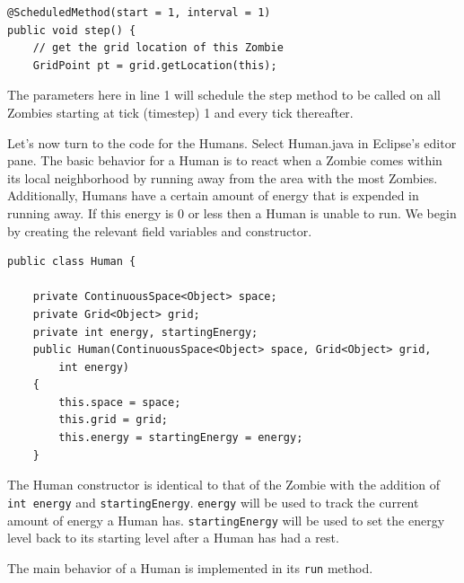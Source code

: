 \documentclass[11pt]{amsart}
\begin{document}
\noindent\begin{minipage}[h]{\textwidth}
\vspace{.2in}
\lstset{language=java,caption=Step Method with Annotation}
\begin{lstlisting}
@ScheduledMethod(start = 1, interval = 1)
public void step() {
	// get the grid location of this Zombie
	GridPoint pt = grid.getLocation(this);
\end{lstlisting}
\vspace{.2in}
\end{minipage}

The parameters here in line 1 will schedule the step method to be called on all Zombies starting at tick (timestep) 1 and every tick thereafter. 

Let's now turn to the code for the Humans. Select Human.java in Eclipse's editor pane. The basic behavior for a Human is to react when a Zombie comes within its local neighborhood by running away from the area with the most Zombies. Additionally, Humans have  a certain amount of energy that is expended in running away. If this energy is 0 or less then a Human is unable to run. We begin by creating the relevant field variables and constructor.

\noindent\begin{minipage}[h]{\textwidth}
\vspace{.2in}
\lstset{language=java,caption=Human Constructor and Variables}
\begin{lstlisting}
public class Human {
	
	private ContinuousSpace<Object> space;
	private Grid<Object> grid;
	private int energy, startingEnergy;
	public Human(ContinuousSpace<Object> space, Grid<Object> grid, 
		int energy) 
	{	
		this.space = space;
		this.grid = grid;
		this.energy = startingEnergy = energy;
	}
\end{lstlisting}
\vspace{.2in}
\end{minipage}
The Human constructor is identical to that of the Zombie with the addition of \texttt{int energy} and \texttt{startingEnergy}. \texttt{energy} will be used to track the current amount of energy a Human has.  \texttt{startingEnergy} will be used to set the energy level back to its starting level after a Human has had a rest. 

The main behavior of a Human is implemented in its \texttt{run} method.
\end{document}
